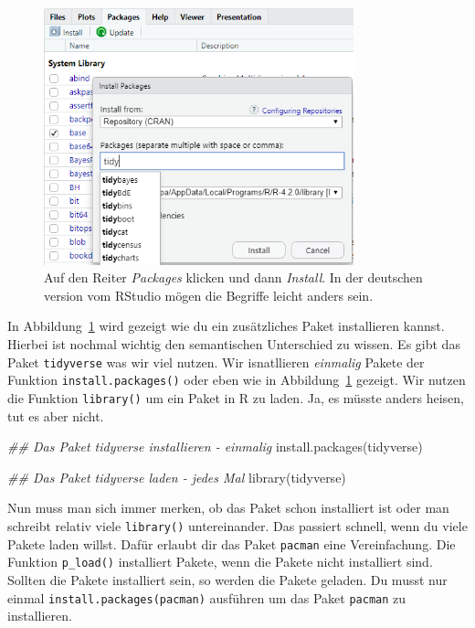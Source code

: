 \documentclass[
  letterpaper,
]{scrbook}
\newenvironment{Shaded}{\begin{snugshade}}{\end{snugshade}}
\newcommand{\DocumentationTok}[1]{\textcolor[rgb]{0.37,0.37,0.37}{\textit{#1}}}
\newcommand{\FunctionTok}[1]{\textcolor[rgb]{0.28,0.35,0.67}{#1}}
\newcommand{\NormalTok}[1]{\textcolor[rgb]{0.00,0.23,0.31}{#1}}
\begin{document}
\begin{figure}

{\centering \includegraphics[width=0.8\textwidth,height=\textheight]{./images/programing_01.PNG}

}

\caption{\label{fig-pro-01}Auf den Reiter \emph{Packages} klicken und
dann \emph{Install}. In der deutschen version vom RStudio mögen die
Begriffe leicht anders sein.}

\end{figure}

In Abbildung~\ref{fig-pro-01} wird gezeigt wie du ein zusätzliches Paket
installieren kannst. Hierbei ist nochmal wichtig den semantischen
Unterschied zu wissen. Es gibt das Paket \texttt{tidyverse} was wir viel
nutzen. Wir isnatllieren \emph{einmalig} Pakete der Funktion
\texttt{install.packages()} oder eben wie in Abbildung~\ref{fig-pro-01}
gezeigt. Wir nutzen die Funktion \texttt{library()} um ein Paket in R zu
laden. Ja, es müsste anders heisen, tut es aber nicht.

\begin{Shaded}
\begin{Highlighting}[]
\DocumentationTok{\#\# Das Paket tidyverse installieren {-} einmalig}
\FunctionTok{install.packages}\NormalTok{(tidyverse)}

\DocumentationTok{\#\# Das Paket tidyverse laden {-} jedes Mal}
\FunctionTok{library}\NormalTok{(tidyverse)}
\end{Highlighting}
\end{Shaded}

Nun muss man sich immer merken, ob das Paket schon installiert ist oder
man schreibt relativ viele \texttt{library()} untereinander. Das
passiert schnell, wenn du viele Pakete laden willst. Dafür erlaubt dir
das Paket \texttt{pacman} eine Vereinfachung. Die Funktion
\texttt{p\_load()} installiert Pakete, wenn die Pakete nicht installiert
sind. Sollten die Pakete installiert sein, so werden die Pakete geladen.
Du musst nur einmal \texttt{install.packages(pacman)} ausführen um das
Paket \texttt{pacman} zu installieren.
\end{document}
